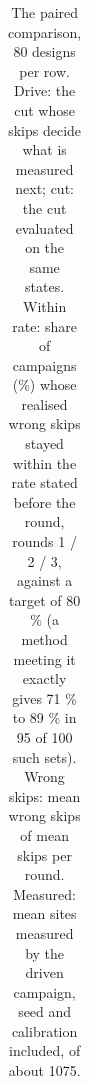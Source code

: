 \documentclass{iopjournal}
\begin{document}
{\renewcommand{\thetable}{S7.4}\small
\begin{longtable}[]{@{}
  >{\raggedright\arraybackslash}p{}
  >{\raggedright\arraybackslash}p{}
  >{\raggedright\arraybackslash}p{}
  >{\raggedright\arraybackslash}p{}
  >{\raggedright\arraybackslash}p{}
  >{\raggedright\arraybackslash}p{}@{}}
\caption{The paired comparison, 80 designs per row. Drive: the cut whose skips decide what is measured next; cut: the cut evaluated on the same states. Within rate: share of campaigns (\%) whose realised wrong skips stayed within the rate stated before the round, rounds 1 / 2 / 3, against a target of 80 \% (a method meeting it exactly gives 71 \% to 89 \% in 95 of 100 such sets). Wrong skips: mean wrong skips of mean skips per round. Measured: mean sites measured by the driven campaign, seed and calibration included, of about 1075.}\label{tab:S7.4}\\


\end{longtable}}
\end{document}
